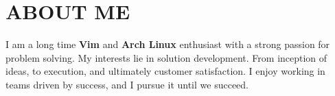 \documentclass{article}
\begin{document}
\section{ABOUT ME}
I am a long time {\bfseries Vim} and {\bfseries Arch Linux} enthusiast with a strong passion for problem solving.
My interests lie in solution development.
From inception of ideas, to execution, and ultimately customer satisfaction.
I enjoy working in teams driven by success, and I pursue it until we succeed.
\end{document}
